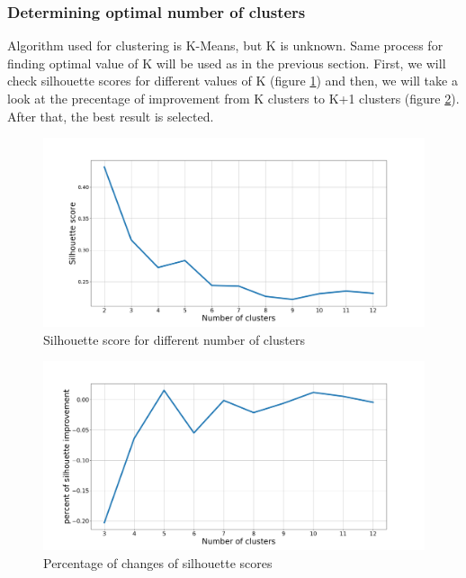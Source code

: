 \documentclass[a4paper]{article}
\begin{document}
\subsubsection{Determining optimal number of clusters}
\label{subsubsec:clust_shooting_by_teams_num_of_clusters}

Algorithm used for clustering is K-Means, but K is unknown. Same process for finding optimal value of K will be used as in the previous section. First, we will check silhouette scores for different values of K (figure \ref{plt:clust_shooting_by_teams_plot1}) and then, we will take a look at the precentage of improvement from K clusters to K+1 clusters (figure \ref{plt:clust_shooting_by_teams_plot2}). After that, the best result is selected.

\begin{figure}[h!]
\begin{center}
\includegraphics[scale=0.28]{num_of_clust_teams_shooting.png}
\end{center}
\caption{Silhouette score for different number of clusters}
\label{plt:clust_shooting_by_teams_plot1}
\end{figure}

\begin{figure}[h!]
\begin{center}
\includegraphics[scale=0.28]{num_of_clust_teams_shooting_pct_change.png}
\end{center}
\caption{Percentage of changes of silhouette scores}
\label{plt:clust_shooting_by_teams_plot2}
\end{figure}
\end{document}
